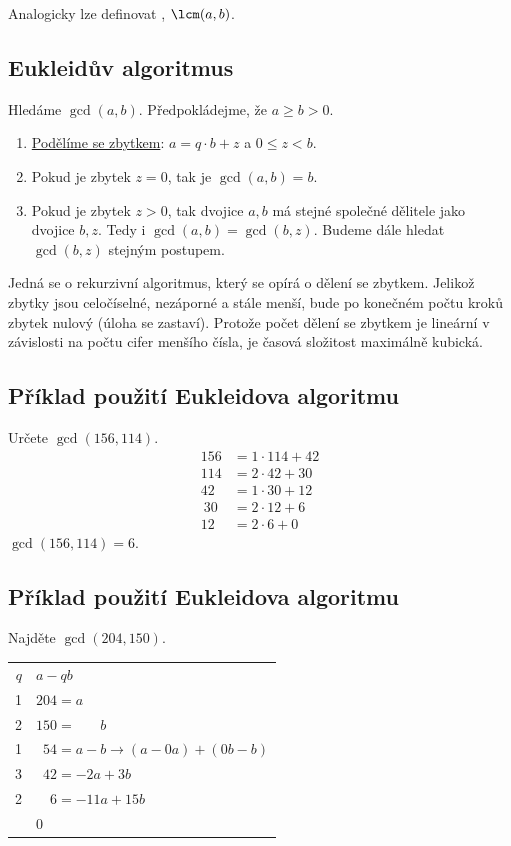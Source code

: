 Analogicky lze definovat , $\lcm(a,b)$.

\subsection{Eukleidův algoritmus}\label{eukleidAlgo}
Hledáme $\gcd(a,b)$. Předpokládejme, že $a \geq b > 0$.
\begin{enumerate}[1)]
	\item \hyperref[delZbyt]{Podělíme se zbytkem}: $a = q \cdot b + z$ a $0 \leq z < b$.
	\item Pokud je zbytek $z = 0$, tak je $\gcd(a,b) = b$.
	\item Pokud je zbytek $z > 0$, tak dvojice $a,b$ má stejné společné dělitele jako dvojice $b,z$. Tedy i $\gcd(a,b) = \gcd(b,z)$. Budeme dále hledat $\gcd(b,z)$ stejným postupem.
\end{enumerate}
Jedná se o rekurzivní algoritmus, který se opírá o dělení se zbytkem. Jelikož zbytky jsou celočíselné, nezáporné a stále menší, bude po konečném počtu kroků zbytek nulový (úloha se zastaví). Protože počet dělení se zbytkem je lineární v závislosti na počtu cifer menšího čísla, je časová složitost maximálně kubická.

\subsection{Příklad použití Eukleidova algoritmu}
Určete $\gcd(156, 114)$.
\begin{align}
	\tag{R1} 156 &= 1 \cdot 114 + 42 \\
	\tag{R2} 114 &= 2 \cdot 42 + 30 \\
	\tag{R3} 42 &= 1 \cdot 30 + 12 \\\
	\tag{R4} 30 &= 2 \cdot 12 + 6 \\
	\tag{R5} 12 &= 2 \cdot \boxed{6}  + 0
\end{align}
$\gcd(156, 114) = 6$.

\subsection{Příklad použití Eukleidova algoritmu}
Najděte $\gcd(204, 150)$.
\begin{center}
	\begin{tabular}{r|l}
		$q$ & $a -qb$\\
		1 & $204 = a$ \\
		2 & $150 = \phantom{a +} b$ \\
		1 & $\phantom{1}54 = a - b \rightarrow (a-0a) + (0b -b)$\\
		3 & $\phantom{1}42 = -2a + 3b$ \\
		2 & $\phantom{11}6 = -11a + 15b$ \\
		& \phantom{11}0 
	\end{tabular}
\end{center}


